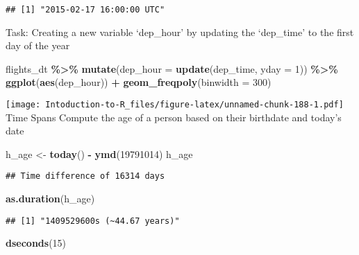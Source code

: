 \documentclass[
]{article}
\newenvironment{Shaded}{\begin{snugshade}}{\end{snugshade}}
\newcommand{\AttributeTok}[1]{\textcolor[rgb]{0.13,0.29,0.53}{#1}}
\newcommand{\DecValTok}[1]{\textcolor[rgb]{0.00,0.00,0.81}{#1}}
\newcommand{\FunctionTok}[1]{\textcolor[rgb]{0.13,0.29,0.53}{\textbf{#1}}}
\newcommand{\NormalTok}[1]{#1}
\newcommand{\OtherTok}[1]{\textcolor[rgb]{0.56,0.35,0.01}{#1}}
\newcommand{\SpecialCharTok}[1]{\textcolor[rgb]{0.81,0.36,0.00}{\textbf{#1}}}
\begin{document}
\begin{verbatim}
## [1] "2015-02-17 16:00:00 UTC"
\end{verbatim}

Task: Creating a new variable `dep\_hour' by updating the `dep\_time' to
the first day of the year

\begin{Shaded}
\begin{Highlighting}[]
\NormalTok{flights\_dt }\SpecialCharTok{\%\textgreater{}\%} 
  \FunctionTok{mutate}\NormalTok{(}\AttributeTok{dep\_hour =} \FunctionTok{update}\NormalTok{(dep\_time, }\AttributeTok{yday =} \DecValTok{1}\NormalTok{)) }\SpecialCharTok{\%\textgreater{}\%} 
  \FunctionTok{ggplot}\NormalTok{(}\FunctionTok{aes}\NormalTok{(dep\_hour)) }\SpecialCharTok{+}
    \FunctionTok{geom\_freqpoly}\NormalTok{(}\AttributeTok{binwidth =} \DecValTok{300}\NormalTok{)}
\end{Highlighting}
\end{Shaded}

\texttt{[image: Intoduction-to-R\_files/figure-latex/unnamed-chunk-188-1.pdf]}
Time Spans Compute the age of a person based on their birthdate and
today's date

\begin{Shaded}
\begin{Highlighting}[]
\NormalTok{h\_age }\OtherTok{\textless{}{-}} \FunctionTok{today}\NormalTok{() }\SpecialCharTok{{-}} \FunctionTok{ymd}\NormalTok{(}\DecValTok{19791014}\NormalTok{)}
\NormalTok{h\_age}
\end{Highlighting}
\end{Shaded}

\begin{verbatim}
## Time difference of 16314 days
\end{verbatim}

\begin{Shaded}
\begin{Highlighting}[]
\FunctionTok{as.duration}\NormalTok{(h\_age)}
\end{Highlighting}
\end{Shaded}

\begin{verbatim}
## [1] "1409529600s (~44.67 years)"
\end{verbatim}

\begin{Shaded}
\begin{Highlighting}[]
\FunctionTok{dseconds}\NormalTok{(}\DecValTok{15}\NormalTok{)}
\end{Highlighting}
\end{Shaded}
\end{document}
